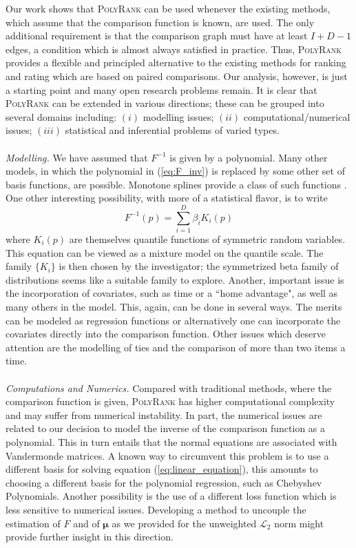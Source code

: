 \documentclass[twoside,11pt]{article}
\begin{document}
Our work shows that \textsc{PolyRank} can be used whenever the existing methods, which assume that the comparison function is known, are used. The only additional requirement is that the comparison graph must have at least $I+D-1$ edges, a condition which is almost always satisfied in practice. Thus, \textsc{PolyRank} provides a flexible and principled alternative to the existing methods for ranking and rating which are based on paired comparisons. Our analysis, however, is just a starting point and many open research problems remain. It is clear that \textsc{PolyRank} can be extended in various directions; these can be grouped into several domains including: $(i)$ modelling issues; $(ii)$ computational/numerical issues; $(iii)$ statistical and inferential problems of varied types. \\
\\
\textit{Modelling.} We have assumed that $F^{-1}$ is given by a polynomial. Many other models, in which the polynomial in (\ref{eq:F_inv}) is replaced by some other set of basis functions, are possible. Monotone splines provide a class of such functions \citep{ramsay}. One other interesting possibility, with more of a statistical flavor, is to write 
\begin{equation*}
    F^{-1}(p)= \sum_{i = 1}^{D} \beta_i K_i(p)
 \end{equation*}%
where $K_i(p)$ are themselves quantile functions of symmetric random variables. This equation can be viewed as a mixture model on the quantile scale. The family $\{K_i\}$ is then chosen by the investigator; the symmetrized beta family of distributions seems like a suitable family to explore. Another, important issue is the incorporation of covariates, such as time or a ``home advantage", as well as many others in the model. This, again, can be done in several ways. The merits can be modeled as regression functions or alternatively one can incorporate the covariates directly into the comparison function. Other issues which deserve attention are the modelling of ties and the comparison of more than two items a time. \\
\\
\textit{Computations and Numerics.} Compared with traditional methods, where the comparison function is given, \textsc{PolyRank} has higher computational complexity and may suffer from numerical instability. In part, the numerical issues are related to our decision to model the inverse of the comparison function as a polynomial. This in turn entails that the normal equations are associated with Vandermonde matrices. A known way to circumvent this problem is to use a different basis for solving equation (\ref{eq:linear_equation}), this amounts to choosing a different  basis for the polynomial regression, such as Chebyshev Polynomials. Another possibility is the use of a different loss function which is less sensitive to numerical issues. Developing a method to uncouple the estimation of $F$ and of $\boldsymbol{\mu}$ as we provided for the unweighted $\mathcal{L}_2$ norm might provide further insight in this direction.
\end{document}
